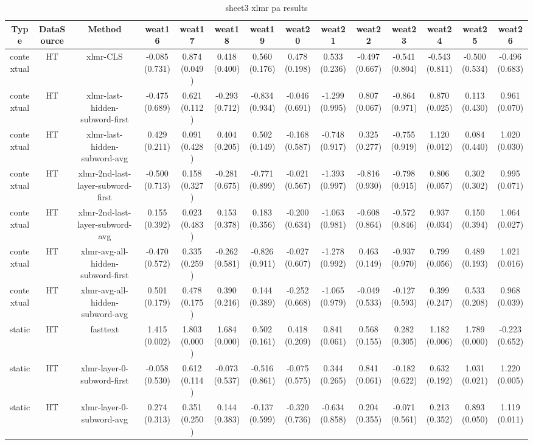 \begin{sidewaystable}[htb]
    \centering
    \caption{sheet3 xlmr pa results}
    \label{appendix_tab:sheet3_xlmr_pa_results}
    \small
    \begin{tabular}{@{}cccccccccccccc@{}}
        \toprule
        Type & DataSource & Method & weat16 & weat17 & weat18 & weat19 & weat20 & weat21 & weat22 & weat23 & weat24 & weat25 & weat26 \\
        \midrule
        contextual & HT & xlmr-CLS & -0.085 (0.731) & 0.874 (0.049) & 0.418 (0.400) & 0.560 (0.176) & 0.478 (0.198) & 0.533 (0.236) & -0.497 (0.667) & -0.541 (0.804) & -0.543 (0.811) & -0.500 (0.534) & -0.496 (0.683) \\
        contextual & HT & xlmr-last-hidden-subword-first & -0.475 (0.689) & 0.621 (0.112) & -0.293 (0.712) & -0.834 (0.934) & -0.046 (0.691) & -1.299 (0.995) & 0.807 (0.067) & -0.864 (0.971) & 0.870 (0.025) & 0.113 (0.430) & 0.961 (0.070) \\
        contextual & HT & xlmr-last-hidden-subword-avg & 0.429 (0.211) & 0.091 (0.428) & 0.404 (0.205) & 0.502 (0.149) & -0.168 (0.587) & -0.748 (0.917) & 0.325 (0.277) & -0.755 (0.919) & 1.120 (0.012) & 0.084 (0.440) & 1.020 (0.030) \\
        contextual & HT & xlmr-2nd-last-layer-subword-first & -0.500 (0.713) & 0.158 (0.327) & -0.281 (0.675) & -0.771 (0.899) & -0.021 (0.567) & -1.393 (0.997) & -0.816 (0.930) & -0.798 (0.915) & 0.806 (0.057) & 0.302 (0.302) & 0.995 (0.071) \\
        contextual & HT & xlmr-2nd-last-layer-subword-avg & 0.155 (0.392) & 0.023 (0.483) & 0.153 (0.378) & 0.183 (0.356) & -0.200 (0.634) & -1.063 (0.981) & -0.608 (0.864) & -0.572 (0.846) & 0.937 (0.034) & 0.150 (0.394) & 1.064 (0.027) \\
        contextual & HT & xlmr-avg-all-hidden-subword-first & -0.470 (0.572) & 0.335 (0.259) & -0.262 (0.581) & -0.826 (0.911) & -0.027 (0.607) & -1.278 (0.992) & 0.463 (0.149) & -0.937 (0.970) & 0.799 (0.056) & 0.489 (0.193) & 1.021 (0.016) \\
        contextual & HT & xlmr-avg-all-hidden-subword-avg & 0.501 (0.179) & 0.478 (0.175) & 0.390 (0.216) & 0.144 (0.389) & -0.252 (0.668) & -1.065 (0.979) & -0.049 (0.533) & -0.127 (0.593) & 0.399 (0.247) & 0.533 (0.208) & 0.968 (0.039) \\
        static & HT & fasttext & 1.415 (0.002) & 1.803 (0.000) & 1.684 (0.000) & 0.502 (0.161) & 0.418 (0.209) & 0.841 (0.061) & 0.568 (0.155) & 0.282 (0.305) & 1.182 (0.006) & 1.789 (0.000) & -0.223 (0.652) \\
        static & HT & xlmr-layer-0-subword-first & -0.058 (0.530) & 0.612 (0.114) & -0.073 (0.537) & -0.516 (0.861) & -0.075 (0.575) & 0.344 (0.265) & 0.841 (0.061) & -0.182 (0.622) & 0.632 (0.192) & 1.031 (0.021) & 1.220 (0.005) \\
        static & HT & xlmr-layer-0-subword-avg & 0.274 (0.313) & 0.351 (0.250) & 0.144 (0.383) & -0.137 (0.599) & -0.320 (0.736) & -0.634 (0.858) & 0.204 (0.355) & -0.071 (0.561) & 0.213 (0.352) & 0.893 (0.050) & 1.119 (0.011) \\
        \bottomrule
    \end{tabular}
\end{sidewaystable}